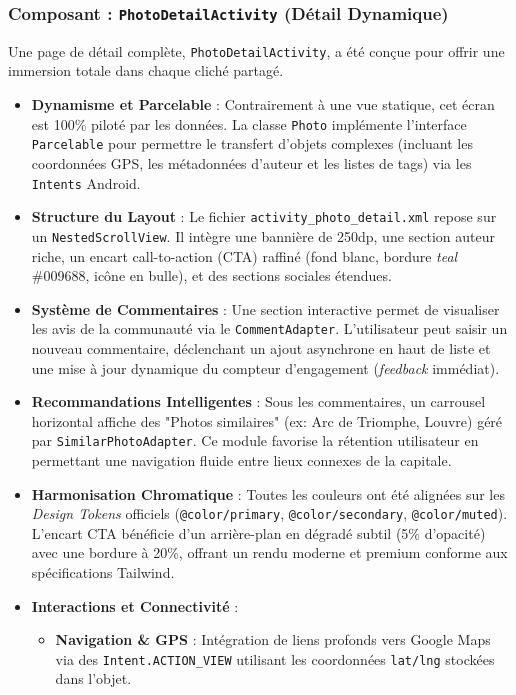 \documentclass{article}
\begin{document}
\subsubsection{Composant : \texttt{PhotoDetailActivity} (Détail Dynamique)}
Une page de détail complète, \texttt{PhotoDetailActivity}, a été conçue pour offrir une immersion totale dans chaque cliché partagé.
\begin{itemize}
    \item \textbf{Dynamisme et Parcelable} : Contrairement à une vue statique, cet écran est 100\% piloté par les données. La classe \texttt{Photo} implémente l'interface \texttt{Parcelable} pour permettre le transfert d'objets complexes (incluant les coordonnées GPS, les métadonnées d'auteur et les listes de tags) via les \texttt{Intents} Android.
    \item \textbf{Structure du Layout} : Le fichier \texttt{activity\_photo\_detail.xml} repose sur un \texttt{NestedScrollView}. Il intègre une bannière de 250dp, une section auteur riche, un encart call-to-action (CTA) raffiné (fond blanc, bordure \textit{teal} \#009688, icône en bulle), et des sections sociales étendues.
    \item \textbf{Système de Commentaires} : Une section interactive permet de visualiser les avis de la communauté via le \texttt{CommentAdapter}. L'utilisateur peut saisir un nouveau commentaire, déclenchant un ajout asynchrone en haut de liste et une mise à jour dynamique du compteur d'engagement (\textit{feedback} immédiat).
    \item \textbf{Recommandations Intelligentes} : Sous les commentaires, un carrousel horizontal affiche des "Photos similaires" (ex: Arc de Triomphe, Louvre) géré par \texttt{SimilarPhotoAdapter}. Ce module favorise la rétention utilisateur en permettant une navigation fluide entre lieux connexes de la capitale.
    \item \textbf{Harmonisation Chromatique} : Toutes les couleurs ont été alignées sur les \textit{Design Tokens} officiels (\texttt{@color/primary}, \texttt{@color/secondary}, \texttt{@color/muted}). L'encart CTA bénéficie d'un arrière-plan en dégradé subtil (5\% d'opacité) avec une bordure à 20\%, offrant un rendu moderne et premium conforme aux spécifications Tailwind.
    \item \textbf{Interactions et Connectivité} :
    \begin{itemize}
        \item \textbf{Navigation \& GPS} : Intégration de liens profonds vers Google Maps via des \texttt{Intent.ACTION\_VIEW} utilisant les coordonnées \texttt{lat/lng} stockées dans l'objet.

\end{itemize}
\end{itemize}
\end{document}
